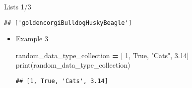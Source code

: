 \documentclass[
  8pt,
  ignorenonframetext,
]{beamer}
\newenvironment{Shaded}{\begin{snugshade}}{\end{snugshade}}
\newcommand{\BuiltInTok}[1]{#1}
\newcommand{\DecValTok}[1]{\textcolor[rgb]{0.00,0.00,0.81}{#1}}
\newcommand{\FloatTok}[1]{\textcolor[rgb]{0.00,0.00,0.81}{#1}}
\newcommand{\NormalTok}[1]{#1}
\newcommand{\OperatorTok}[1]{\textcolor[rgb]{0.81,0.36,0.00}{\textbf{#1}}}
\newcommand{\StringTok}[1]{\textcolor[rgb]{0.31,0.60,0.02}{#1}}
\newcommand{\VariableTok}[1]{\textcolor[rgb]{0.00,0.00,0.00}{#1}}
\begin{document}
\begin{frame}[fragile]{Lists 1/3}
\begin{itemize}[<+->]
\begin{verbatim}
## ['goldencorgiBulldogHuskyBeagle']
\end{verbatim}
\end{itemize}

\begin{itemize}[<+->]
\item
  Example 3

\begin{Shaded}
\begin{Highlighting}[]
\NormalTok{random\_data\_type\_collection }\OperatorTok{=}\NormalTok{ [ }\DecValTok{1}\NormalTok{, }\VariableTok{True}\NormalTok{, }\StringTok{"Cats"}\NormalTok{, }\FloatTok{3.14}\NormalTok{]}
\BuiltInTok{print}\NormalTok{(random\_data\_type\_collection)}
\end{Highlighting}
\end{Shaded}

\begin{verbatim}
## [1, True, 'Cats', 3.14]
\end{verbatim}
\end{itemize}
\end{frame}
\end{document}
